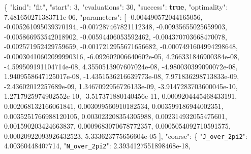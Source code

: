 \documentclass[
  10pt,
]{article}
\newenvironment{Shaded}{}{}
\newcommand{\DataTypeTok}[1]{\textcolor[rgb]{0.56,0.13,0.00}{#1}}
\newcommand{\DecValTok}[1]{\textcolor[rgb]{0.25,0.63,0.44}{#1}}
\newcommand{\FloatTok}[1]{\textcolor[rgb]{0.25,0.63,0.44}{#1}}
\newcommand{\FunctionTok}[1]{\textcolor[rgb]{0.02,0.16,0.49}{#1}}
\newcommand{\KeywordTok}[1]{\textcolor[rgb]{0.00,0.44,0.13}{\textbf{#1}}}
\newcommand{\OtherTok}[1]{\textcolor[rgb]{0.00,0.44,0.13}{#1}}
\newcommand{\StringTok}[1]{\textcolor[rgb]{0.25,0.44,0.63}{#1}}
\begin{document}
\begin{Shaded}
\begin{Highlighting}[]
\FunctionTok{\{}
  \DataTypeTok{"kind"}\FunctionTok{:} \StringTok{"fit"}\FunctionTok{,}
  \DataTypeTok{"start"}\FunctionTok{:} \DecValTok{3}\FunctionTok{,}
  \DataTypeTok{"evaluations"}\FunctionTok{:} \DecValTok{30}\FunctionTok{,}
  \DataTypeTok{"success"}\FunctionTok{:} \KeywordTok{true}\FunctionTok{,}
  \DataTypeTok{"optimality"}\FunctionTok{:} \FloatTok{7.481650271383711e{-}06}\FunctionTok{,}
  \DataTypeTok{"parameters"}\FunctionTok{:} \OtherTok{[}
    \FloatTok{{-}0.004490572044165056}\OtherTok{,}
    \FloatTok{{-}0.005261095039370194}\OtherTok{,}
    \FloatTok{{-}0.007287467821112348}\OtherTok{,}
    \FloatTok{{-}0.00935655025659903}\OtherTok{,}
    \FloatTok{{-}0.005866953542018902}\OtherTok{,}
    \FloatTok{{-}0.00594406053592462}\OtherTok{,}
    \FloatTok{{-}0.004370703668470078}\OtherTok{,}
    \FloatTok{{-}0.002571952429759659}\OtherTok{,}
    \FloatTok{{-}0.0017212955671656682}\OtherTok{,}
    \FloatTok{{-}0.0007491604994298648}\OtherTok{,}
    \FloatTok{{-}0.00030410602099990316}\OtherTok{,}
    \FloatTok{{-}6.092602006640602e{-}05}\OtherTok{,}
    \FloatTok{4.266331846900384e{-}08}\OtherTok{,}
    \FloatTok{{-}4.599509191104714e{-}08}\OtherTok{,}
    \FloatTok{4.3550513907607024e{-}08}\OtherTok{,}
    \FloatTok{{-}4.980030399090072e{-}08}\OtherTok{,}
    \FloatTok{1.9409558647125017e{-}08}\OtherTok{,}
    \FloatTok{{-}1.4351536216639773e{-}08}\OtherTok{,}
    \FloatTok{7.971836298713833e{-}09}\OtherTok{,}
    \FloatTok{{-}2.43602012257689e{-}09}\OtherTok{,}
    \FloatTok{1.3467092956726133e{-}09}\OtherTok{,}
    \FloatTok{{-}3.9147283703600045e{-}10}\OtherTok{,}
    \FloatTok{1.2717925974902552e{-}10}\OtherTok{,}
    \FloatTok{{-}3.517371880140456e{-}11}\OtherTok{,}
    \FloatTok{0.0009204445468433191}\OtherTok{,}
    \FloatTok{0.002068132166061841}\OtherTok{,}
    \FloatTok{0.003099560910182534}\OtherTok{,}
    \FloatTok{0.003599186944002351}\OtherTok{,}
    \FloatTok{0.0035251766988120105}\OtherTok{,}
    \FloatTok{0.003023208354305988}\OtherTok{,}
    \FloatTok{0.002314932055475601}\OtherTok{,}
    \FloatTok{0.001590203424663837}\OtherTok{,}
    \FloatTok{0.0009683070678772357}\OtherTok{,}
    \FloatTok{0.0005054092710591575}\OtherTok{,}
    \FloatTok{0.00020922093926432523}\OtherTok{,}
    \FloatTok{5.333623775656604e{-}05}
  \OtherTok{]}\FunctionTok{,}
  \DataTypeTok{"coarse"}\FunctionTok{:} \FunctionTok{\{}
    \DataTypeTok{"\nolinkurl{J_over_2pi2}"}\FunctionTok{:} \FloatTok{4.00360448407714}\FunctionTok{,}
    \DataTypeTok{"\nolinkurl{N_over_2pi2}"}\FunctionTok{:} \FloatTok{2.3934127551898468e{-}18}\FunctionTok{,}

\end{Highlighting}
\end{Shaded}
\end{document}
